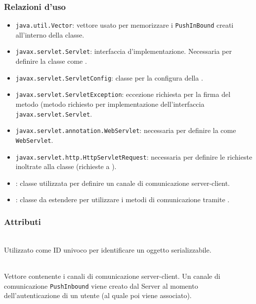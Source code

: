 \subsubsection*{Relazioni d'uso}
\begin{itemize}
	\item \texttt{java.util.Vector}: vettore usato per memorizzare i \texttt{PushInBound} creati all'interno della classe.
	\item \texttt{javax.servlet.Servlet}: interfaccia d'implementazione. Necessaria per definire la classe come .
	\item \texttt{javax.servlet.ServletConfig}: classe per la configura della . 
	\item \texttt{javax.servlet.ServletException}: eccezione richiesta per la firma del metodo  (metodo richiesto per implementazione dell'interfaccia \texttt{javax.servlet.Servlet}.
	\item \texttt{javax.servlet.annotation.WebServlet}: necessaria per definire la  come \texttt{WebServlet}.
	\item \texttt{javax.servlet.http.HttpServletRequest}: necessaria per definire le richieste inoltrate alla classe (richieste a ).
	\item {}: classe utilizzata per definire un canale di comunicazione server-client.
	\item {}: classe da estendere per utilizzare i metodi di comunicazione tramite .
\end{itemize}

\subsubsection*{Attributi}
\begin{description}
  \item{}\\
  Utilizzato come ID univoco per identificare un oggetto serializzabile.
  \item{}\\
  Vettore contenente i canali di comunicazione server-client. Un canale di comunicazione \texttt{PushInbound} viene creato dal Server al momento dell'autenticazione di un utente (al quale poi viene associato).
\end{description}

